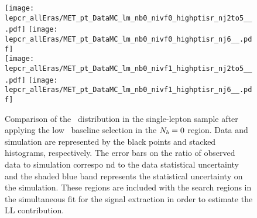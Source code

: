 \begin{figure}[!htb]
	\begin{center}
  \texttt{[image: lepcr\_allEras/MET\_pt\_DataMC\_lm\_nb0\_nivf0\_highptisr\_nj2to5\_\_.pdf]}
  \texttt{[image: lepcr\_allEras/MET\_pt\_DataMC\_lm\_nb0\_nivf0\_highptisr\_nj6\_\_.pdf]} \\
  \texttt{[image: lepcr\_allEras/MET\_pt\_DataMC\_lm\_nb0\_nivf1\_highptisr\_nj2to5\_\_.pdf]}
  \texttt{[image: lepcr\_allEras/MET\_pt\_DataMC\_lm\_nb0\_nivf1\_highptisr\_nj6\_\_.pdf]} \\
	\end{center}
	\caption[Lost Lepton LM Control Region $\nb=0$]{Comparison of the \met~distribution in the single-lepton sample after applying the low \dm~baseline selection in the $\nb=0$ region. Data and simulation are represented by the black points and stacked histograms, respectively. The error bars on the ratio of observed data to simulation correspo    nd to the data statistical uncertainty and the shaded blue band represents the statistical uncertainty on the simulation. These regions are included with the search regions in the simultaneous fit for the signal extraction in order to estimate the LL contribution.
	 }
	\label{fig:llb-1lcr-datavsmc-lm-nb0}
\end{figure}
